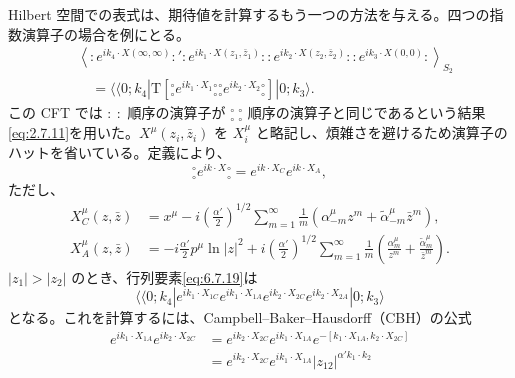 
Hilbert 空間での表式は、期待値を計算するもう一つの方法を与える。四つの指数演算子の場合を例にとる。
\begin{equation}
\begin{aligned}
&\left\langle:e^{ik_4\cdot X(\infty,\infty)}:'
:e^{ik_1\cdot X(z_1,\bar z_1)}:
:e^{ik_2\cdot X(z_2,\bar z_2)}:
:e^{ik_3\cdot X(0,0)}:\right\rangle_{S_2}\\
&\quad=\langle\!\langle0;k_4|\mathrm T[
{}^\circ_\circ e^{ik_1\cdot X_1}{}^\circ_\circ
{}^\circ_\circ e^{ik_2\cdot X_2}{}^\circ_\circ]|0;k_3\rangle .
\end{aligned}
\tag{6.7.19}\label{eq:6.7.19}
\end{equation}
この CFT では $:\ :$ 順序の演算子が
${}^\circ_\circ\ {}^\circ_\circ$ 順序の演算子と同じであるという結果\eqref{eq:2.7.11}を用いた。$X^\mu(z_i,\bar z_i)$ を $X_i^\mu$ と略記し、煩雑さを避けるため演算子のハットを省いている。定義により、
\begin{equation}
{}^\circ_\circ e^{ik\cdot X}{}^\circ_\circ
=e^{ik\cdot X_C}e^{ik\cdot X_A},
\tag{6.7.20}\label{eq:6.7.20}
\end{equation}
ただし、
\begin{align}
X_C^\mu(z,\bar z)
&=x^\mu-i\left(\frac{\alpha'}2\right)^{1/2}
\sum_{m=1}^{\infty}\frac1m
(\alpha^\mu_{-m}z^m+\widetilde\alpha^\mu_{-m}\bar z^m),
\tag{6.7.21a}\label{eq:6.7.21a}\\
X_A^\mu(z,\bar z)
&=-i\frac{\alpha'}2p^\mu\ln|z|^2
+i\left(\frac{\alpha'}2\right)^{1/2}
\sum_{m=1}^{\infty}\frac1m
\left(\frac{\alpha^\mu_m}{z^m}
+\frac{\widetilde\alpha^\mu_m}{\bar z^m}\right).
\tag{6.7.21b}\label{eq:6.7.21b}
\end{align}
$|z_1|>|z_2|$ のとき、行列要素\eqref{eq:6.7.19}は
\begin{equation}
\langle\!\langle0;k_4|
e^{ik_1\cdot X_{1C}}e^{ik_1\cdot X_{1A}}
e^{ik_2\cdot X_{2C}}e^{ik_2\cdot X_{2A}}
|0;k_3\rangle
\tag{6.7.22}\label{eq:6.7.22}
\end{equation}
となる。これを計算するには、Campbell--Baker--Hausdorff（CBH）の公式
\begin{equation}
\begin{aligned}
e^{ik_1\cdot X_{1A}}e^{ik_2\cdot X_{2C}}
&=e^{ik_2\cdot X_{2C}}e^{ik_1\cdot X_{1A}}
e^{-[k_1\cdot X_{1A},k_2\cdot X_{2C}]}\\
&=e^{ik_2\cdot X_{2C}}e^{ik_1\cdot X_{1A}}
|z_{12}|^{\alpha'k_1\cdot k_2}
\end{aligned}
\tag{6.7.23}\label{eq:6.7.23}
\end{equation}
